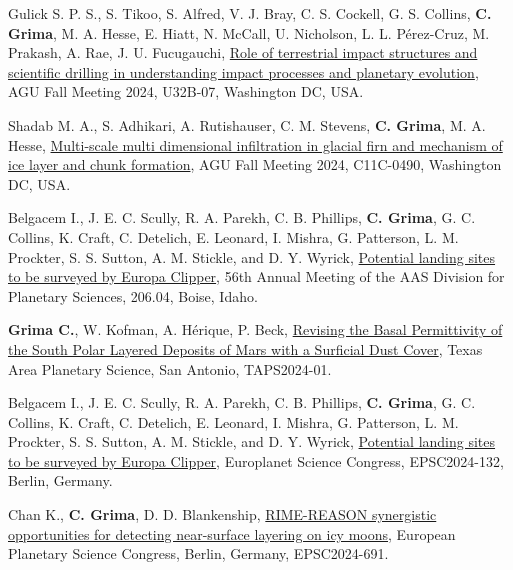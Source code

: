 \begin{etaremune}
\item
    Gulick S. P. S., S. Tikoo, S. Alfred, V. J. Bray, C. S. Cockell, G. S. Collins, \textbf{C. Grima}, M. A. Hesse, E. Hiatt, N. McCall, U. Nicholson, L. L. Pérez-Cruz, M. Prakash, A. Rae, J. U. Fucugauchi, \href{https://agu.confex.com/agu/agu24/meetingapp.cgi/Paper/1707094}{Role of terrestrial impact structures and scientific drilling in understanding impact processes and planetary evolution}, AGU Fall Meeting 2024, U32B-07, Washington DC, USA.

\item
    Shadab M. A., S. Adhikari, A. Rutishauser, C. M. Stevens, \textbf{C. Grima}, M. A. Hesse, \href{https://agu.confex.com/agu/agu24/meetingapp.cgi/Paper/1526301}{Multi-scale multi dimensional infiltration in glacial firn and mechanism of ice layer and chunk formation}, AGU Fall Meeting 2024, C11C-0490, Washington DC, USA.

\item
    Belgacem I., J. E. C. Scully, R. A. Parekh, C. B. Phillips, \textbf{C. Grima}, G. C. Collins, K. Craft, C. Detelich, E. Leonard, I. Mishra, G. Patterson, L. M. Prockter, S. S. Sutton, A. M. Stickle, and D. Y. Wyrick,   \href{https://submissions.mirasmart.com/DPS56/Itinerary/PresentationDetail.aspx?evdid=59}{Potential landing sites to be surveyed by Europa Clipper}, 56th Annual Meeting of the AAS Division for Planetary Sciences, 206.04, Boise, Idaho.

\item
   \textbf{Grima C.}, W. Kofman, A. Hérique, P. Beck, \href{https://drive.google.com/file/d/17kSupFJCrgi3--fEiE2FkWA5e0QUbko7/view}{Revising the Basal Permittivity of the South Polar Layered Deposits of Mars with a Surficial Dust Cover}, Texas Area Planetary Science, San Antonio, TAPS2024-01.

\item
    Belgacem I., J. E. C. Scully, R. A. Parekh, C. B. Phillips, \textbf{C. Grima}, G. C. Collins, K. Craft, C. Detelich, E. Leonard, I. Mishra, G. Patterson, L. M. Prockter, S. S. Sutton, A. M. Stickle, and D. Y. Wyrick,   \href{https://meetingorganizer.copernicus.org/EPSC2024/EPSC2024-132.html}{Potential landing sites to be surveyed by Europa Clipper}, Europlanet Science Congress, EPSC2024-132, Berlin, Germany.

\item 
    Chan K., \textbf{C. Grima}, D. D. Blankenship, \href{}{RIME-REASON synergistic opportunities for detecting near-surface layering on icy moons}, European Planetary Science Congress, Berlin, Germany, EPSC2024-691.
    

\end{etaremune}
